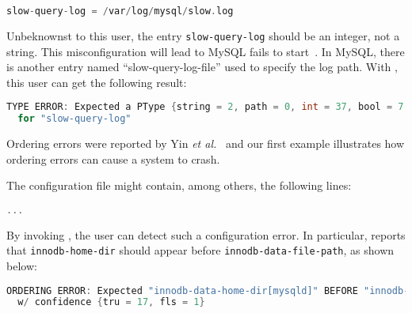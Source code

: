 \begin{lstlisting}[language=C, xleftmargin=.01\textwidth]
    slow-query-log = /var/log/mysql/slow.log
\end{lstlisting} 

Unbeknownst to this user, the entry {\tt slow-query-log} should be an 
integer, not a string. This misconfiguration will lead to 
MySQL fails to start~\cite{querylog}. In MySQL, there is another entry 
named ``slow-query-log-file'' used to specify the log path.
With \app, this user can get the following result:

\begin{lstlisting}[language=C, xleftmargin=.01\textwidth]
TYPE ERROR: Expected a PType {string = 2, path = 0, int = 37, bool = 7, size = 0} 
  for "slow-query-log"
\end{lstlisting} 

Ordering errors were reported by Yin {\em et al.}~\cite{yin11anempirical} and our first
example illustrates how ordering errors can cause a system to crash. 

The configuration file might contain, among others, the following lines:

\begin{lstlisting}[language=C, xleftmargin=.01\textwidth]
     ...
\end{lstlisting}


By invoking \app, the user can detect such a configuration error.
In particular, \app reports that {\tt innodb-home-dir} 
should appear before {\tt innodb-data-file-path}, as shown
below:
 
\begin{lstlisting}[language=C, xleftmargin=.01\textwidth]
ORDERING ERROR: Expected "innodb-data-home-dir[mysqld]" BEFORE "innodb-data-file-path[mysqld]" 
  w/ confidence {tru = 17, fls = 1}
\end{lstlisting} 



